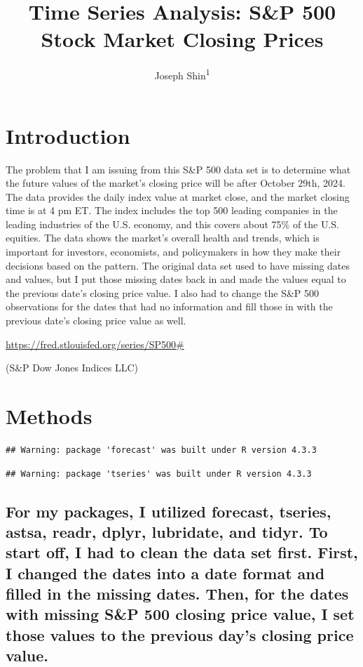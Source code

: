 \documentclass[
  man]{apa6}
\title{Time Series Analysis: S\&P 500 Stock Market Closing Prices}
\author{Joseph Shin\textsuperscript{1}}
\date{}
\affiliation{\vspace{0.5cm}\textsuperscript{1} UIUC}
\begin{document}
\maketitle

\section{Introduction}\label{introduction}

The problem that I am issuing from this S\&P 500 data set is to determine what the future values of the market's closing price will be after October 29th, 2024. The data provides the daily index value at market close, and the market closing time is at 4 pm ET. The index includes the top 500 leading companies in the leading industries of the U.S. economy, and this covers about 75\% of the U.S. equities. The data shows the market's overall health and trends, which is important for investors, economists, and policymakers in how they make their decisions based on the pattern. The original data set used to have missing dates and values, but I put those missing dates back in and made the values equal to the previous date's closing price value. I also had to change the S\&P 500 observations for the dates that had no information and fill those in with the previous date's closing price value as well.

\url{https://fred.stlouisfed.org/series/SP500\#}

(S\&P Dow Jones Indices LLC)

\section{Methods}\label{methods}

\begin{verbatim}
## Warning: package 'forecast' was built under R version 4.3.3
\end{verbatim}

\begin{verbatim}
## Warning: package 'tseries' was built under R version 4.3.3
\end{verbatim}

\subsection{For my packages, I utilized forecast, tseries, astsa, readr, dplyr, lubridate, and tidyr. To start off, I had to clean the data set first. First, I changed the dates into a date format and filled in the missing dates. Then, for the dates with missing S\&P 500 closing price value, I set those values to the previous day's closing price value.}\label{for-my-packages-i-utilized-forecast-tseries-astsa-readr-dplyr-lubridate-and-tidyr.-to-start-off-i-had-to-clean-the-data-set-first.-first-i-changed-the-dates-into-a-date-format-and-filled-in-the-missing-dates.-then-for-the-dates-with-missing-sp-500-closing-price-value-i-set-those-values-to-the-previous-days-closing-price-value.}
\end{document}
